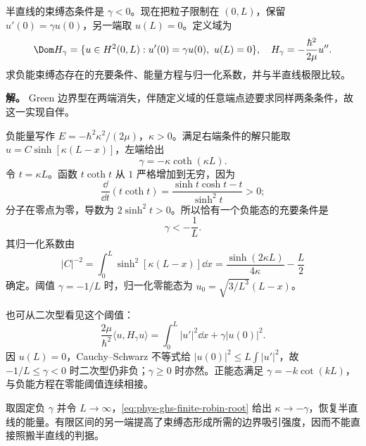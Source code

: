 \begin{example}
\label{ex:phys-ghs-finite-robin}
半直线的束缚态条件是 $\gamma<0$。现在把粒子限制在 $(0,L)$，保留 $u'(0)=\gamma u(0)$，另一端取 $u(L)=0$。定义域为
\[
\Dom H_\gamma=\{u\in H^2(0,L):u'(0)=\gamma u(0),\ u(L)=0\},
\quad H_\gamma=-\frac{\hbar^2}{2\mu}u''.
\]
求负能束缚态存在的充要条件、能量方程与归一化系数，并与半直线极限比较。

\textbf{解。} Green 边界型在两端消失，伴随定义域的任意端点迹要求同样两条条件，故这一实现自伴。

负能量写作 $E=-\hbar^2\kappa^2/(2\mu)$，$\kappa>0$。满足右端条件的解只能取 $u=C\sinh[\kappa(L-x)]$，左端给出
\begin{equation}
\gamma=-\kappa\coth(\kappa L).
\label{eq:phys-ghs-finite-robin-root}
\end{equation}
令 $t=\kappa L$。函数 $t\coth t$ 从 $1$ 严格增加到无穷，因为
\[
\frac{\dd}{\dd t}(t\coth t)
=\frac{\sinh t\cosh t-t}{\sinh^2t}>0;
\]
分子在零点为零，导数为 $2\sinh^2t>0$。所以恰有一个负能态的充要条件是
\begin{equation}
\gamma<-\frac1L.
\label{eq:phys-ghs-finite-robin-threshold}
\end{equation}
其归一化系数由
\[
|C|^{-2}=\int_0^L\sinh^2[\kappa(L-x)]\dd x
=\frac{\sinh(2\kappa L)}{4\kappa}-\frac L2
\]
确定。阈值 $\gamma=-1/L$ 时，归一化零能态为 $u_0=\sqrt{3/L^3}(L-x)$。

也可从二次型看见这个阈值：
\[
\frac{2\mu}{\hbar^2}\langle u,H_\gamma u\rangle
=\int_0^L|u'|^2\dd x+\gamma|u(0)|^2.
\]
因 $u(L)=0$，Cauchy--Schwarz 不等式给 $|u(0)|^2\le L\int|u'|^2$，故 $-1/L\le\gamma<0$ 时二次型仍非负；$\gamma\ge0$ 时亦然。正能态满足 $\gamma=-k\cot(kL)$，与负能方程在零能阈值连续相接。

取固定负 $\gamma$ 并令 $L\to\infty$，\cref{eq:phys-ghs-finite-robin-root} 给出 $\kappa\to-\gamma$，恢复半直线的能量。有限区间的另一端提高了束缚态形成所需的边界吸引强度，因而不能直接照搬半直线的判据。
\end{example}
